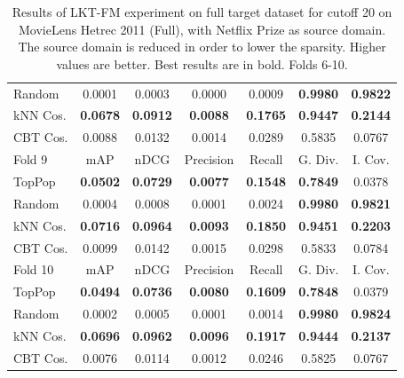 \begin{table}[hbt]
\begin{tabulary}{\textwidth}{|L|CCCCCC|}
Random & 0.0001 &           0.0003 &           0.0000 &           0.0009 &                                  \textbf{0.9980} &                                   \textbf{0.9822} \\
kNN Cos. & \textbf{0.0678} &  \textbf{0.0912} &  \textbf{0.0088} &  \textbf{0.1765} &                                  \textbf{0.9447} &                                   \textbf{0.2144} \\
CBT Cos. & 0.0088 &           0.0132 &           0.0014 &           0.0289 &                                           0.5835 &                                            0.0767 \\
\hline
\hline
Fold 9 & mAP & nDCG & Precision & Recall & G. Div. & I. Cov. \\
\hline
TopPop & \textbf{0.0502} &  \textbf{0.0729} &  \textbf{0.0077} &  \textbf{0.1548} &                                  \textbf{0.7849} &                                            0.0378 \\
Random & 0.0004 &           0.0008 &           0.0001 &           0.0024 &                                  \textbf{0.9980} &                                   \textbf{0.9821} \\
kNN Cos. & \textbf{0.0716} &  \textbf{0.0964} &  \textbf{0.0093} &  \textbf{0.1850} &                                  \textbf{0.9451} &                                   \textbf{0.2203} \\
CBT Cos. & 0.0099 &           0.0142 &           0.0015 &           0.0298 &                                           0.5833 &                                            0.0784 \\
\hline
\hline
Fold 10 & mAP & nDCG & Precision & Recall & G. Div. & I. Cov. \\
\hline
TopPop & \textbf{0.0494} &  \textbf{0.0736} &  \textbf{0.0080} &  \textbf{0.1609} &                                  \textbf{0.7848} &                                            0.0379 \\
Random & 0.0002 &           0.0005 &           0.0001 &           0.0014 &                                  \textbf{0.9980} &                                   \textbf{0.9824} \\
kNN Cos. & \textbf{0.0696} &  \textbf{0.0962} &  \textbf{0.0096} &  \textbf{0.1917} &                                  \textbf{0.9444} &                                   \textbf{0.2137} \\
CBT Cos. & 0.0076 &           0.0114 &           0.0012 &           0.0246 &                                           0.5825 &                                            0.0767 \\
\hline
\end{tabulary}
\caption{Results of LKT-FM experiment on full target dataset for cutoff 20 on MovieLens Hetrec 2011 (Full), with Netflix Prize as source domain. The source domain is reduced in order to lower the sparsity. Higher values are better. Best results are in bold. Folds 6-10.}
\end{table}

